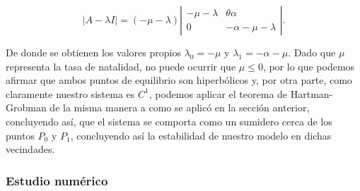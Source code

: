 $$|A-\lambda I|=(-\mu-\lambda)
\left|\begin{array}{cc}
-\mu-\lambda & \theta\alpha\\
0 & -\alpha-\mu -\lambda
\end{array}\right|.$$

De donde se obtienen los valores propios $\lambda_0 = -\mu$ y $\lambda_1 = -\alpha-\mu$. Dado que $\mu$ representa la tasa de natalidad, no puede ocurrir que $\mu\leq0$, por lo que podemos afirmar que ambos puntos de equilibrio son hiperbólicos y, por otra parte, como claramente nuestro sistema es $C^1$, podemos aplicar el teorema de Hartman-Grobman de la misma manera a como se aplicó en la sección anterior, concluyendo así, que el sistema se comporta como un sumidero cerca de los puntos $P_0$ y $P_1$, concluyendo así la estabilidad de nuestro modelo en dichas vecindades.






\subsubsection{Estudio numérico}

